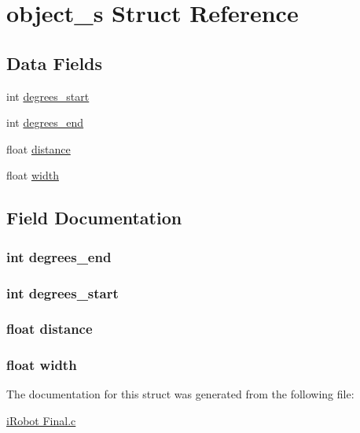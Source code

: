 \hypertarget{structobject__s}{\section{object\-\_\-s Struct Reference}
\label{structobject__s}
}
\subsection*{Data Fields}
\begin{DoxyCompactItemize}
\item 
int \hyperlink{structobject__s_a7d51d03bf9fefdc0e525753e17efaf66}{degrees\-\_\-start}
\item 
int \hyperlink{structobject__s_a94487a8ac4f22ad68620babb5f628216}{degrees\-\_\-end}
\item 
float \hyperlink{structobject__s_a06f14a9abd47b91465f895d5259cdc1b}{distance}
\item 
float \hyperlink{structobject__s_ae426f00e82704fa09578f5446e22d915}{width}
\end{DoxyCompactItemize}


\subsection{Field Documentation}
\hypertarget{structobject__s_a94487a8ac4f22ad68620babb5f628216}{
\subsubsection[{degrees\-\_\-end}]{\setlength{\rightskip}{0pt plus 5cm}int degrees\-\_\-end}}\label{structobject__s_a94487a8ac4f22ad68620babb5f628216}
\hypertarget{structobject__s_a7d51d03bf9fefdc0e525753e17efaf66}{
\subsubsection[{degrees\-\_\-start}]{\setlength{\rightskip}{0pt plus 5cm}int degrees\-\_\-start}}\label{structobject__s_a7d51d03bf9fefdc0e525753e17efaf66}
\hypertarget{structobject__s_a06f14a9abd47b91465f895d5259cdc1b}{
\subsubsection[{distance}]{\setlength{\rightskip}{0pt plus 5cm}float distance}}\label{structobject__s_a06f14a9abd47b91465f895d5259cdc1b}
\hypertarget{structobject__s_ae426f00e82704fa09578f5446e22d915}{
\subsubsection[{width}]{\setlength{\rightskip}{0pt plus 5cm}float width}}\label{structobject__s_ae426f00e82704fa09578f5446e22d915}


The documentation for this struct was generated from the following file\-:\begin{DoxyCompactItemize}
\item 
\hyperlink{i_robot_01_final_8c}{i\-Robot Final.\-c}\end{DoxyCompactItemize}
